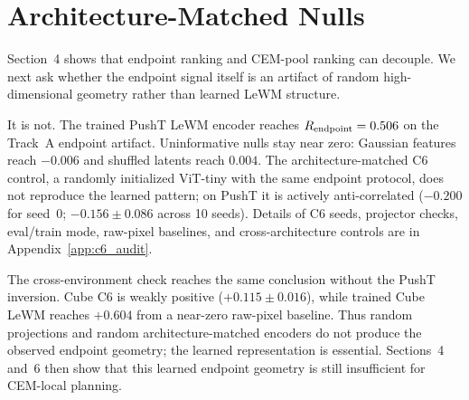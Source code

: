 \section{Architecture-Matched Nulls}

Section~4 shows that endpoint ranking and CEM-pool ranking can decouple. We next ask whether the endpoint signal itself is an artifact of random high-dimensional geometry rather than learned LeWM structure.

It is not. The trained PushT LeWM encoder reaches $R_\text{endpoint}=0.506$ on the Track~A endpoint artifact. Uninformative nulls stay near zero: Gaussian features reach $-0.006$ and shuffled latents reach $0.004$. The architecture-matched C6 control, a randomly initialized ViT-tiny with the same endpoint protocol, does not reproduce the learned pattern; on PushT it is actively anti-correlated ($-0.200$ for seed~0; $-0.156 \pm 0.086$ across 10 seeds). Details of C6 seeds, projector checks, eval/train mode, raw-pixel baselines, and cross-architecture controls are in Appendix~\ref{app:c6_audit}.

The cross-environment check reaches the same conclusion without the PushT inversion. Cube C6 is weakly positive ($+0.115 \pm 0.016$), while trained Cube LeWM reaches $+0.604$ from a near-zero raw-pixel baseline. Thus random projections and random architecture-matched encoders do not produce the observed endpoint geometry; the learned representation is essential. Sections~4 and~6 then show that this learned endpoint geometry is still insufficient for CEM-local planning.
